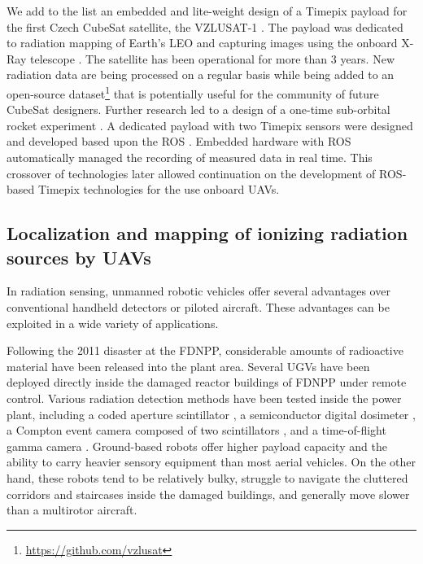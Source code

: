 \documentclass[a4paper,11pt,twoside,openright]{book}
\begin{document}

We add to the list an embedded and lite-weight design of a Timepix payload for the first Czech CubeSat satellite, the VZLUSAT-1 \cite{urban2017vzlusat, daniel2019inorbit}.
The payload was dedicated to radiation mapping of Earth's \ac{LEO} \cite{baca2018timepix} and capturing images using the onboard X-Ray telescope \cite{baca2016miniaturized}.
The satellite has been operational for more than 3 years.
New radiation data are being processed on a regular basis while being added to an open-source dataset\footnote{\url{https://github.com/vzlusat}} that is potentially useful for the community of future CubeSat designers.
Further research led to a design of a one-time sub-orbital rocket experiment \cite{daniel2017xray, urban2020rex}.
A dedicated payload with two Timepix sensors were designed and developed based upon the \acl{ROS} \cite{baca2018rospix}.
Embedded hardware with \ac{ROS} automatically managed the recording of measured data in real time.
This crossover of technologies later allowed continuation on the development of \ac{ROS}-based Timepix technologies for the use onboard \aclp{UAV}.



\subsection{Localization and mapping of ionizing radiation sources by \acp{UAV}}

In radiation sensing, unmanned robotic vehicles offer several advantages over conventional handheld detectors or piloted aircraft.
These advantages can be exploited in a wide variety of applications.

Following the 2011 disaster at the \ac{FDNPP}, considerable amounts of radioactive material have been released into the plant area.
Several \acp{UGV} have been deployed directly inside the damaged reactor buildings of \ac{FDNPP} under remote control.
Various radiation detection methods have been tested inside the power plant, including a coded aperture scintillator \cite{ohno2011robotic}, a semiconductor digital dosimeter \cite{nagatani2013emergency}, a Compton event camera composed of two scintillators \cite{sato2019radiation}, and a time-of-flight gamma camera \cite{kinoshita2014development}.
Ground-based robots offer higher payload capacity and the ability to carry heavier sensory equipment than most aerial vehicles.
On the other hand, these robots tend to be relatively bulky, struggle to navigate the cluttered corridors and staircases inside the damaged buildings, and generally move slower than a multirotor aircraft.
\end{document}
